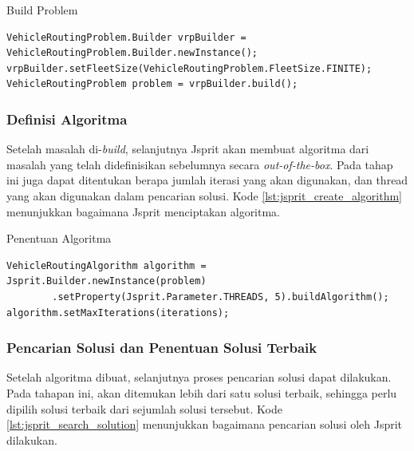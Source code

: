\begin{listing}
	\caption{Build Problem}
	\label{lst:jsprit_build_problem}
	\begin{verbatim}
VehicleRoutingProblem.Builder vrpBuilder = VehicleRoutingProblem.Builder.newInstance();
vrpBuilder.setFleetSize(VehicleRoutingProblem.FleetSize.FINITE);
VehicleRoutingProblem problem = vrpBuilder.build();
	\end{verbatim}
\end{listing}


\subsubsection{Definisi Algoritma}
Setelah masalah di-\textit{build}, selanjutnya Jsprit akan membuat algoritma dari masalah yang telah didefinisikan sebelumnya secara \textit{out-of-the-box}. Pada tahap ini juga dapat ditentukan berapa jumlah iterasi yang akan digunakan, dan thread yang akan digunakan dalam pencarian solusi. Kode \ref{lst:jsprit_create_algorithm} menunjukkan bagaimana Jsprit menciptakan algoritma.


\begin{listing}
	\caption{Penentuan Algoritma}
	\label{lst:jsprit_create_algorithm}
	\begin{verbatim}
VehicleRoutingAlgorithm algorithm = Jsprit.Builder.newInstance(problem)
        .setProperty(Jsprit.Parameter.THREADS, 5).buildAlgorithm();
algorithm.setMaxIterations(iterations);
	\end{verbatim}
\end{listing}


\subsubsection{Pencarian Solusi dan Penentuan Solusi Terbaik}
Setelah algoritma dibuat, selanjutnya proses pencarian solusi dapat dilakukan. Pada tahapan ini, akan ditemukan lebih dari satu solusi terbaik, sehingga perlu dipilih solusi terbaik dari sejumlah solusi tersebut. Kode \ref{lst:jsprit_search_solution} menunjukkan bagaimana pencarian solusi oleh Jsprit dilakukan.


